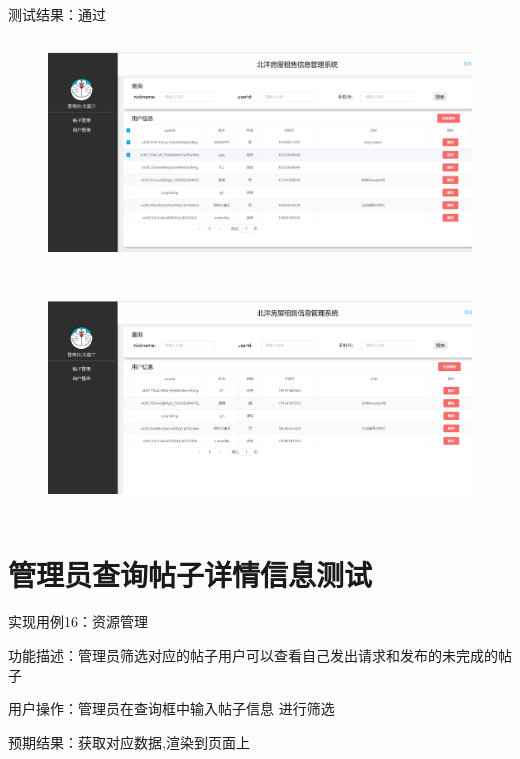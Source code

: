 测试结果：通过
\begin{figure}[htbp]
    \centering
    \begin{minipage}[t]{0.9\textwidth}
    \centering
    \includegraphics[width=12cm,height=6cm]{test/image/adm6.png} 
    \end{minipage}
    \end{figure}
    \newpage 
    \begin{figure}[htbp]
        \centering
        \begin{minipage}[t]{0.9\textwidth}
        \centering
        \includegraphics[width=12cm,height=6cm]{test/image/adm7.png} 
        \end{minipage}
        \end{figure}
            
\section{管理员查询帖子详情信息测试}
实现用例16：资源管理

功能描述：管理员筛选对应的帖子用户可以查看自己发出请求和发布的未完成的帖子
   
用户操作：管理员在查询框中输入帖子信息 进行筛选

预期结果：获取对应数据,渲染到页面上

